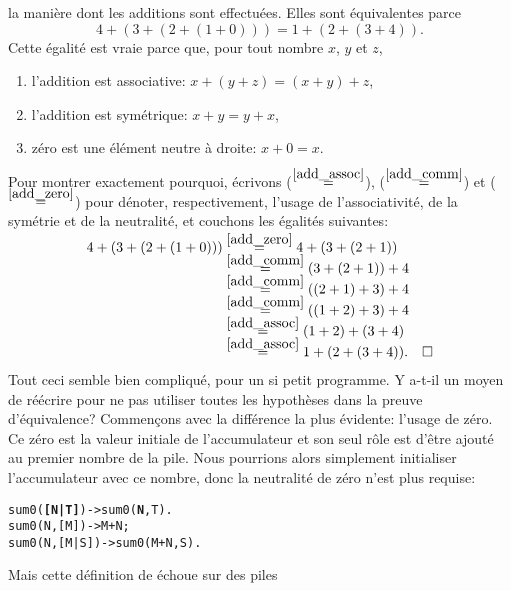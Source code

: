 la manière dont les additions sont effectuées. Elles sont équivalentes
parce
\begin{equation*}
4 + (3 + (2 + (1 + 0))) = 1 + (2 + (3 + 4)).
\end{equation*}
Cette égalité est vraie parce que, pour tout nombre \(x\), \(y\) et
\(z\),\label{proof_sum}
\begin{enumerate}

  \item \label{add_assoc} l'addition est associative: \(x + (y + z) =
    (x + y) + z\),

  \item \label{add_comm} l'addition est symétrique: \(x + y = y +
    x\),

  \item \label{add_zero} zéro est une élément neutre à droite: \(x+0 =
    x\).

\end{enumerate}
Pour montrer exactement pourquoi, écrivons
(\(\mathrel{\stackrel{\smash{\ref{add_assoc}}}{=}}\)), (\(\mathrel{\stackrel{\smash{\ref{add_comm}}}{=}}\)) et
(\(\mathrel{\stackrel{\smash{\ref{add_zero}}}{=}}\)) pour dénoter, respectivement, l'usage de
l'associativité, de la symétrie et de la neutralité, et couchons les
égalités suivantes:
\begin{align*}
4 + (3 + (2 + (1 + 0)))
  &\mathrel{\stackrel{\smash{\smash{\ref{add_zero}}}}{=}}  4 + (3 + (2 + 1))\\
  &\mathrel{\stackrel{\smash{\smash{\ref{add_comm}}}}{=}}  (3 + (2 + 1)) + 4\\
  &\mathrel{\stackrel{\smash{\smash{\ref{add_comm}}}}{=}}  ((2 + 1) + 3) + 4\\
  &\mathrel{\stackrel{\smash{\smash{\ref{add_comm}}}}{=}}  ((1 + 2) + 3) + 4\\
  &\mathrel{\stackrel{\smash{\smash{\ref{add_assoc}}}}{=}} (1 + 2) + (3 + 4)\\
  &\mathrel{\stackrel{\smash{\smash{\ref{add_assoc}}}}{=}} 1 + (2 + (3 + 4)).\quad\Box
\end{align*}
Tout ceci semble bien compliqué, pour un si petit programme. Y a-t-il
un moyen de réécrire  pour ne pas utiliser toutes les
hypothèses dans la preuve d'équivalence? Commençons avec la différence
la plus évidente: l'usage de zéro. Ce zéro est la valeur initiale de
l'accumulateur et son seul rôle est d'être ajouté au premier nombre de
la pile. Nous pourrions alors simplement initialiser l'accumulateur
avec ce nombre, donc la neutralité de zéro n'est plus requise:
\begin{alltt}
sum0(\textbf{[N|T]})   -> sum0(\textbf{N},T).
sum0(N,[M])   -> M+N;
sum0(N,[M|S]) -> sum0(M+N,S).
\end{alltt}
Mais cette définition de  échoue sur des piles
